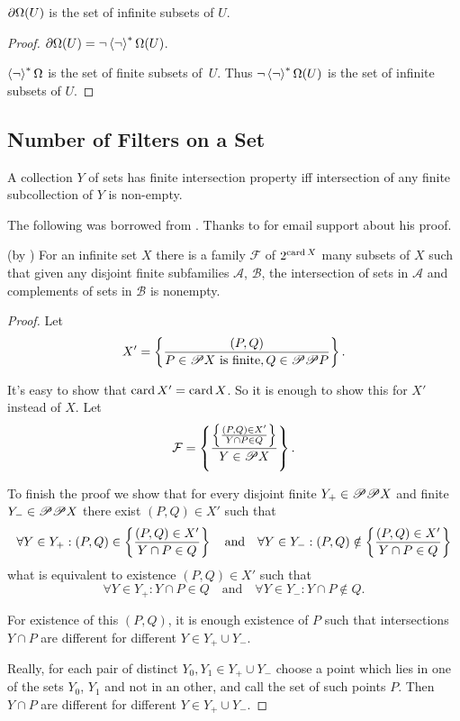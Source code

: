 \begin{prop}
$\partial\Omega(U)$ is the set of infinite subsets of $U$.\end{prop}
\begin{proof}
$\partial\Omega(U)=\lnot\left\langle \lnot\right\rangle ^{\ast}\Omega(U)$.

$\left\langle \lnot\right\rangle ^{\ast}\Omega$ is the set of finite subsets of~$U$. Thus
$\lnot\left\langle \lnot\right\rangle ^{\ast}\Omega(U)$ is the set of infinite subsets of
$U$.
\end{proof}

\subsection{Number of Filters on a Set}
\begin{defn}
A collection $Y$ of sets has
finite intersection property iff intersection of any finite subcollection
of $Y$ is non-empty.
\end{defn}
The following was borrowed from \cite{blassnotesultra}. Thanks to
 for email support about his proof.
\begin{lem}
(by ) For an infinite set $X$ there is a family $\mathcal{F}$
of $2^{\operatorname{card} X}$ many subsets of $X$ such that given any disjoint
finite subfamilies $\mathcal{A}$, $\mathcal{B}$, the intersection
of sets in $\mathcal{A}$ and complements of sets in $\mathcal{B}$
is nonempty.\end{lem}
\begin{proof}
Let
\[
X'=\left\{ \frac{(P,Q)}{P\in\mathscr{P} X\text{ is finite},Q\in\mathscr{P}\mathscr{P} P}\right\}.
\]


It's easy to show that $\operatorname{card} X'=\operatorname{card} X$. So it is enough to show
this for $X'$ instead of $X$. Let
\[
\mathcal{F}=\left\{ \frac{\left\{ \frac{(P,Q)\in X'}{Y\cap P\in Q}\right\}}{Y\in\mathscr{P} X}\right\}.
\]


To finish the proof we show that for every disjoint finite $Y_{+}\in\mathscr{P}\mathscr{P} X$
and finite $Y_{-}\in\mathscr{P}\mathscr{P} X$ there exist $(P,Q)\in X'$
such that
\[
\forall Y\in Y_{+}:(P,Q)\in\left\{ \frac{(P,Q)\in X'}{Y\cap P\in Q}\right\}\quad\text{and}\quad\forall Y\in Y_{-}:(P,Q)\notin\left\{ \frac{(P,Q)\in X'}{Y\cap P\in Q}\right\}
\]
what is equivalent to existence $(P,Q)\in X'$ such that
\[
\forall Y\in Y_{+}:Y\cap P\in Q\quad\text{and}\quad\forall Y\in Y_{-}:Y\cap P\notin Q.
\]


For existence of this $(P,Q)$, it is enough existence of $P$ such
that intersections $Y\cap P$ are different for different $Y\in Y_{+}\cup Y_{-}$.

Really, for each pair of distinct $Y_{0},Y_{1}\in Y_{+}\cup Y_{-}$
choose a point which lies in one of the sets $Y_{0}$, $Y_{1}$ and
not in an other, and call the set of such points $P$. Then $Y\cap P$
are different for different $Y\in Y_{+}\cup Y_{-}$.\end{proof}
